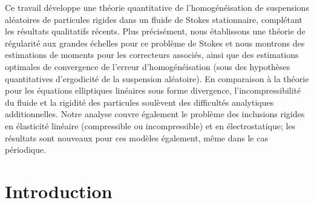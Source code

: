 \documentclass[JEP,XML,SOM,Unicode,published]{cedram}
\theoremstyle{plain}
\theoremstyle{definition}
\begin{document}




\begin{altabstract}
Ce travail développe une théorie quantitative de l’homogénéisation de suspensions aléatoires de particules rigides dans un fluide de Stokes stationnaire, complétant les résultats qualitatifs récents. Plus précisément, nous établissons une théorie de régularité aux grandes échelles pour ce problème de Stokes et nous montrons des estimations de moments pour les correcteurs associés, ainsi que des estimations optimales de convergence de l’erreur d'homogénéisation (sous des hypothèses quantitatives d’ergodicité de la suspension aléatoire). En comparaison à la théorie pour les équations elliptiques linéaires sous forme divergence, l’incompressibilité du fluide et la rigidité des particules soulèvent des difficultés analytiques additionnelles. Notre analyse couvre également le problème des inclusions rigides en élasticité linéaire (compressible ou incompressible) et en électrostatique; les résultats sont nouveaux pour ces modèles également, même dans le cas périodique.
\end{altabstract}

\maketitle
\vspace*{-\baselineskip}
\tableofcontents
\mainmatter

\section{Introduction}
\end{document}
